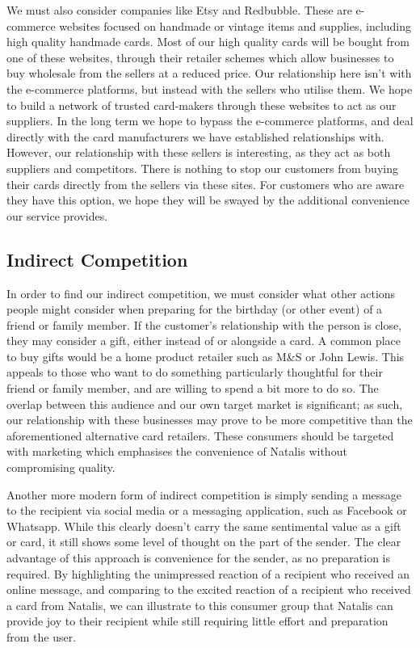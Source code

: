 \documentclass[10pt,a4paper]{article}
\begin{document}
We must also consider companies like Etsy and Redbubble. These are e-commerce websites focused on handmade or vintage items and supplies, including high quality handmade cards. Most of our high quality cards will be bought from one of these websites, through their retailer schemes which allow businesses to buy wholesale from the sellers at a reduced price. Our relationship here isn't with the e-commerce platforms, but instead with the sellers who utilise them. We hope to build a network of trusted card-makers through these websites to act as our suppliers. In the long term we hope to bypass the e-commerce platforms, and deal directly with the card manufacturers we have established relationships with. However, our relationship with these sellers is interesting, as they act as both suppliers and competitors. There is nothing to stop our customers from buying their cards directly from the sellers via these sites. For customers who are aware they have this option, we hope they will be swayed by the additional convenience our service provides.

\subsection*{Indirect Competition}

In order to find our indirect competition, we must consider what other actions people might consider when preparing for the birthday (or other event) of a friend or family member. If the customer's relationship with the person is close, they may consider a gift, either instead of or alongside a card. A common place to buy gifts would be a home product retailer such as M\&S or John Lewis. This appeals to those who want to do something particularly thoughtful for their friend or family member, and are willing to spend a bit more to do so. The overlap between this audience and our own target market is significant; as such, our relationship with these businesses may prove to be more competitive than the aforementioned alternative card retailers. These consumers should be targeted with marketing which emphasises the convenience of Natalis without compromising quality.

Another more modern form of indirect competition is simply sending a message to the recipient via social media or a messaging application, such as Facebook or Whatsapp. While this clearly doesn't carry the same sentimental value as a gift or card, it still shows some level of thought on the part of the sender. The clear advantage of this approach is convenience for the sender, as no preparation is required. By highlighting the unimpressed reaction of a recipient who received an online message, and comparing to the excited reaction of a recipient who received a card from Natalis, we can illustrate to this consumer group that Natalis can provide joy to their recipient while still requiring little effort and preparation from the user.
\end{document}
